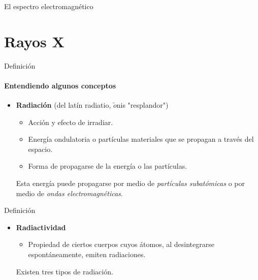 \documentclass{beamer}
\begin{document}
\begin{darkframes}
\begin{frame}{El espectro electromagn\'etico}
    \end{frame}
    
    \section{Rayos X} %
    \begin{frame}{Definici\'on} %
      \framesubtitle{Entendiendo algunos conceptos} %
      \begin{itemize}
          \item \textbf{Radiaci\'on} (del lat\'in radiatio, $\tilde{o}$nis "resplandor")
          \begin{itemize}
          \item Acci\'on y efecto de irradiar.
          \item Energ\'ia ondulatoria o part\'iculas materiales que se propagan a trav\'es del espacio.
          \item Forma de propagarse de la energ\'ia o las part\'iculas.
          \end{itemize}
          Esta energ\'ia puede propagarse por medio de \textit{part\'iculas subat\'omicas} o por medio de \textit{ondas electromagn\'eticas}. 
      \end{itemize}
      

    \end{frame}
    
    \begin{frame}{Definici\'on} %
      \begin{itemize}
          \item \textbf{Radiactividad}
          \begin{itemize}
          \item Propiedad de ciertos cuerpos cuyos \'atomos, al desintegrarse espont\'aneamente, emiten radiaciones.
          \end{itemize}
      \vfill
      \vfill
      \vfill
      Existen tres tipos de radiaci\'on.
      \end{itemize}
      


\end{frame}
\end{darkframes}
\end{document}

